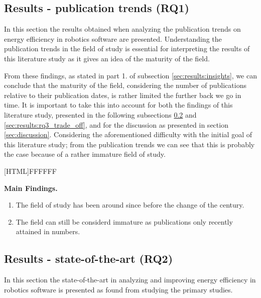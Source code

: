 \subsection{Results - publication trends (RQ1)}
\label{sec:results:rq1_pub_trends}

In this section the results obtained when analyzing the publication trends on energy efficiency in robotics software are presented.
Understanding the publication trends in the field of study is essential for interpreting the results of this literature study as it gives
an idea of the maturity of the field.

From these findings, as stated in part 1. of subsection \ref{sec:results:insights}, we can conclude that the maturity of the field, considering the number of publications relative to their publication dates, 
is rather limited the further back we go in time. It is important to take this into account for both the findings of this literature study, presented in the following subsections 
\ref{sec:results:rq2_state_of_the_art} and \ref{sec:results:rq3_trade_off}, and for the discussion as presented in section \ref{sec:discussion}.
Considering the aforementioned difficulty with the initial goal of this literature study; from the publication trends we can see that this 
is probably the case because of a rather immature field of study.

\vspace{5mm}

\noindent{}[HTML]{FFFFFF}{\parbox{0.47\textwidth}{%
\noindent \textbf{Main Findings.}
\begin{enumerate}[nolistsep]
\item The field of study has been around since before the change of the century.
\item The field can still be considerd immature as publications only recently attained in numbers.
\end{enumerate}}}


\subsection{Results - state-of-the-art (RQ2)}
\label{sec:results:rq2_state_of_the_art}
In this section the state-of-the-art in analyzing and improving energy efficiency in robotics software is presented as found from studying the primary studies.

